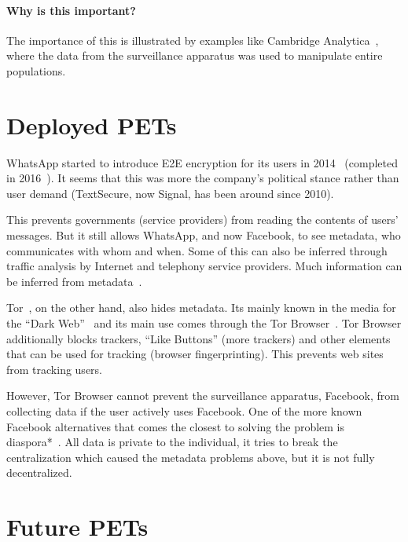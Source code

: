 \paragraph{Why is this important?}

The importance of this is illustrated by examples like Cambridge 
Analytica~\cite{%
  cambridge-analytica-wired,
  cambridge-analytica-guardian,
  cambridge-analytica-nytimes,
  cambridge-analytica-wp%
}, where the data from the surveillance apparatus was used to manipulate entire 
populations.


\section{Deployed \acp{PET}}

WhatsApp started to introduce \ac{E2E} encryption for its users in 
2014~\cite{WhatsAppIntroducesE2Eencryption} (completed in 
2016~\cite{WhatsAppE2Ecomplete}).
It seems that this was more the company's political stance rather than user 
demand (TextSecure, now Signal, has been around since 2010).

This prevents governments (\ie service providers) from reading the contents of 
users' messages.
But it still allows WhatsApp, and now Facebook, to see metadata, \ie who 
communicates with whom and when.
Some of this can also be inferred through traffic analysis by \eg Internet and 
telephony service providers.
Much information can be inferred from metadata~\cite{DevilInMetadata}.

Tor~\cite{Tor}, on the other hand, also hides metadata.
Its mainly known in the media for the \enquote{Dark Web}~\cite{?} and its main 
use comes through the Tor Browser~\cite{?}.
Tor Browser additionally blocks trackers, \enquote{Like Buttons} (\ie more 
trackers) and other elements that can be used for tracking (\eg browser 
fingerprinting).
This prevents web sites from tracking users.

However, Tor Browser cannot prevent the surveillance apparatus, \eg Facebook, 
from collecting data if the user actively uses Facebook.
One of the more known Facebook alternatives that comes the closest to solving 
the problem is diaspora*~\cite{?}.
All data is private to the individual, it tries to break the centralization 
which caused the metadata problems above, but it is not fully decentralized.


\section{Future \acp{PET}}

